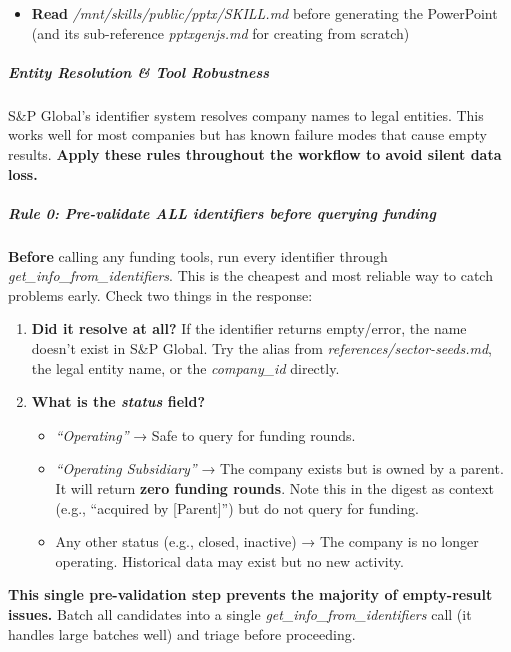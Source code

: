 \documentclass[11pt]{article}
\begin{document}
\begin{itemize}[leftmargin=*,itemsep=2pt,topsep=2pt]
\item {} \textbf{Read} \emph{/mnt/skills/public/pptx/SKILL.md} before generating the PowerPoint (and its sub-reference \emph{pptxgenjs.md} for creating from scratch)
\end{itemize}

\subparagraph{Entity Resolution \& Tool Robustness}\mbox{}\par

S\&P Global's identifier system resolves company names to legal entities. This works well for most companies but has known failure modes that cause empty results. \textbf{Apply these rules throughout the workflow to avoid silent data loss.}


\subparagraph{Rule 0: Pre-validate ALL identifiers before querying funding}\mbox{}\par

\textbf{Before} calling any funding tools, run every identifier through \emph{get\_\allowbreak{}info\_\allowbreak{}from\_\allowbreak{}identifiers}. This is the cheapest and most reliable way to catch problems early. Check two things in the response:


\begin{enumerate}[leftmargin=*,itemsep=2pt,topsep=2pt]
\item {} \textbf{Did it resolve at all?} If the identifier returns empty/error, the name doesn't exist in S\&P Global. Try the alias from \emph{references/sector-seeds.md}, the legal entity name, or the \emph{company\_\allowbreak{}id} directly.
\item {} \textbf{What is the \emph{status} field?}
\begin{itemize}[leftmargin=*,itemsep=2pt,topsep=2pt]
\item {} \emph{``Operating''} → Safe to query for funding rounds.
\item {} \emph{``Operating Subsidiary''} → The company exists but is owned by a parent. It will return \textbf{zero funding rounds}. Note this in the digest as context (e.g., ``acquired by [Parent]'') but do not query for funding.
\item {} Any other status (e.g., closed, inactive) → The company is no longer operating. Historical data may exist but no new activity.
\end{itemize}
\end{enumerate}

\textbf{This single pre-validation step prevents the majority of empty-result issues.} Batch all candidates into a single \emph{get\_\allowbreak{}info\_\allowbreak{}from\_\allowbreak{}identifiers} call (it handles large batches well) and triage before proceeding.
\end{document}
